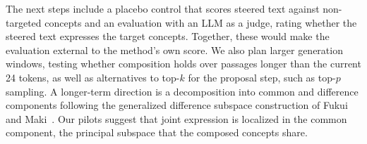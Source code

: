 \documentclass[a4paper,10pt,twocolumn]{article}
\begin{document}
The next steps include a placebo control that scores steered text against
non-targeted concepts and an evaluation with an LLM as a judge, rating whether the steered text expresses the target concepts. Together, these would make the evaluation external to the method's own score. We also plan larger generation windows, testing whether composition holds over passages longer than the current 24 tokens, as well as alternatives to top-$k$ for the proposal step, such as top-$p$ sampling. A longer-term direction is a decomposition into common and difference components following the generalized difference subspace construction of Fukui and Maki~\cite{fukui2015difference}. Our pilots suggest that joint expression is localized in the common component, the principal subspace that the composed concepts share.



\end{document}
